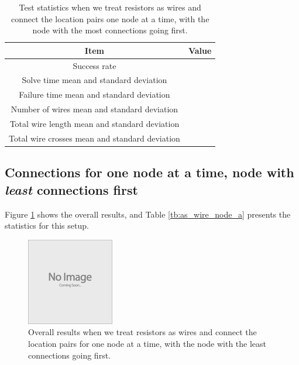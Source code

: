 \begin{table}[H]
\begin{center}
\begin{singlespace}
\begin{tabular}{| c | c |}
\hline
Item & Value \\
\hline\hline
Success rate & \\
Solve time mean and standard deviation & \\
Failure time mean and standard deviation & \\
Number of wires mean and standard deviation & \\
Total wire length mean and standard deviation & \\
Total wire crosses mean and standard deviation & \\
\hline
\end{tabular}
\end{singlespace}
\end{center}
\label{tb:as_wire_node_d}
\caption{Test statistics when we treat resistors as wires and connect the
location pairs one node at a time, with the node with the most connections going
first.}
\end{table}

\subsection{Connections for one node at a time, node with \textit{least}
connections first}

Figure \ref{fig:as_wire_node_a} shows the overall results, and Table
\ref{tb:as_wire_node_a} presents the statistics for this setup.

\begin{figure}[H]
\begin{center}
\includegraphics{Images/placeholder.jpg}
\caption{Overall results when we treat resistors as wires and connect the
location pairs for one node at a time, with the node with the least connections
going first.}
\label{fig:as_wire_node_a}
\end{center}
\end{figure}


